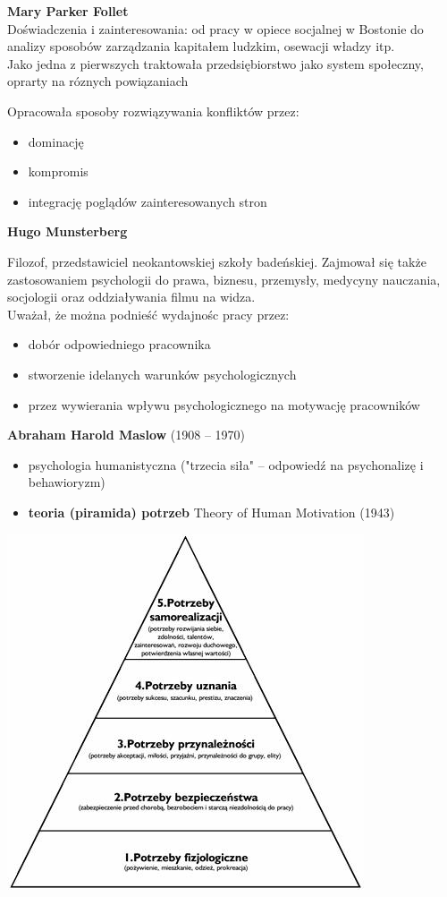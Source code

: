 \documentclass[a4paper,10pt]{report}
\begin{document}
\textbf{Mary Parker Follet}
\\
Doświadczenia i zainteresowania: od pracy w opiece socjalnej w Bostonie do analizy sposobów zarządzania kapitałem ludzkim, osewacji władzy itp.
\\
Jako jedna z pierwszych traktowała przedsiębiorstwo jako system społeczny, oprarty na róznych powiązaniach

Opracowała sposoby rozwiązywania konfliktów przez:
\begin{itemize}
	\item dominację
	\item  kompromis
	\item  integrację poglądów zainteresowanych stron
\end{itemize}


\textbf{Hugo Munsterberg}

Filozof, przedstawiciel neokantowskiej szkoły badeńskiej. Zajmował się także zastosowaniem psychologii do prawa, biznesu, przemysły, medycyny nauczania, socjologii oraz oddziaływania filmu na widza.\\

Uważał, że można podnieść wydajnośc pracy przez:
\begin{itemize}
	\item dobór odpowiedniego pracownika
	\item stworzenie idelanych warunków psychologicznych
	\item przez wywierania wpływu psychologicznego na motywację pracowników
\end{itemize}

\textbf{Abraham Harold Maslow} (1908 -- 1970)
\begin{itemize}
	\item psychologia humanistyczna ("trzecia siła" -- odpowiedź na psychonalizę i behawioryzm)
	\item \textbf{teoria (piramida) potrzeb} Theory of Human Motivation (1943)
\end{itemize}

\begin{center}
	\includegraphics[scale=0.5]{assets/maslow}\\
\end{center}
\end{document}
